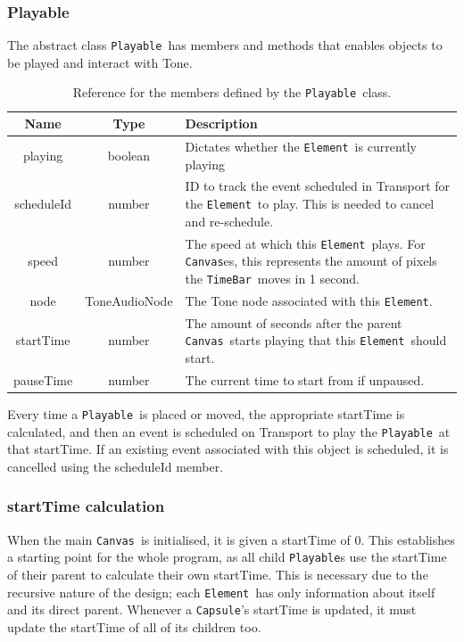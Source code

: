 \documentclass[12pt,a4paper,oneside,openright]{report}
\newcommand{\element}{\texttt{Element}}
\newcommand{\canvas}{\texttt{Canvas}}
\newcommand{\timebar}{\texttt{TimeBar}}
\newcommand{\playable}{\texttt{Playable}}
\newcommand{\capsule}{\texttt{Capsule}}
\begin{document}
\subsubsection{Playable}
The abstract class \playable\ has members and methods that enables objects to be played and interact with Tone. 

\begin{table}[h]
    \centering
    \begin{tabular}{c|c|p{280pt}}
        Name & Type & Description \\
        \hline
        playing & boolean & Dictates whether the \element\ is currently playing\\
        scheduleId & number & ID to track the event scheduled in Transport for the \element\ to play. This is needed to cancel and re-schedule.\\
        speed & number & The speed at which this \element\ plays. For \canvas es, this represents the amount of pixels the \timebar\ moves in 1 second.\\
        node & ToneAudioNode & The Tone node associated with this \element.\\
        startTime & number & The amount of seconds after the parent \canvas\ starts playing that this \element\ should start.\\
        pauseTime & number & The current time to start from if unpaused.\\
    \end{tabular}
    \caption{Reference for the members defined by the \playable\ class.}
    \label{tab:playable_members}
\end{table}

Every time a \playable\ is placed or moved, the appropriate startTime is calculated, and then an event is scheduled on Transport to play the \playable\ at that startTime. If an existing event associated with this object is scheduled, it is cancelled using the scheduleId member.

\subsubsection{startTime calculation}
When the main \canvas\ is initialised, it is given a startTime of 0. This establishes a starting point for the whole program, as all child \playable s use the startTime of their parent to calculate their own startTime. This is necessary due to the recursive nature of the design; each \element\ has only information about itself and its direct parent. Whenever a \capsule's startTime is updated, it must update the startTime of all of its children too.
\end{document}
